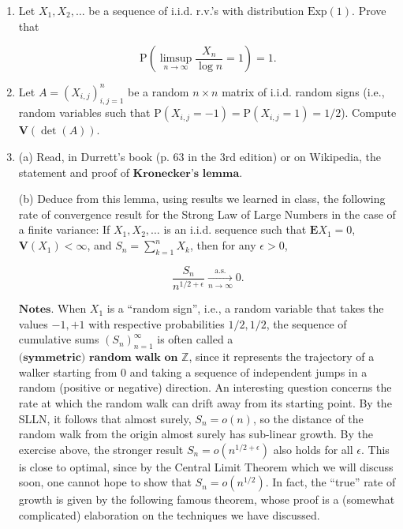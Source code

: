 \documentclass[11pt]{report}
\theoremstyle{plain}
\theoremstyle{definition}
\begin{document}
\begin{enumerate}[label=\arabic*.]
$\textbf{Hint.}$ Assume without loss of generality
that $\mathbf{E} X=0$. For any $a>0$, we have that
$\mathrm{P}(X\ge t) \le \mathrm{P}((X+a)^2\ge
(a+t)^2)$.
Bound this using known methods and then look for the
value of $a$ that gives the best bound.

\item Let $X_1,X_2,\ldots$ be a sequence of i.i.d. r.v.'s
with distribution $\textrm{Exp}(1)$. Prove that

\[
\mathrm{P}\left( \limsup_{n\to\infty} \frac{X_n}{\log n} = 1\right) = 1.
\]

\item Let $A=(X_{i,j})_{i,j=1}^n$ be a random $n\times n$
matrix of i.i.d. random signs (i.e., random variables
such that
$\mathrm{P}(X_{i,j}=-1) = \mathrm{P}(X_{i,j}=1)=1/2$).
Compute $\mathbf{V}(\det(A))$.

\item (a) Read, in Durrett's book (p. 63 in the 3rd
edition) or on Wikipedia, the statement and proof of
$\textbf{Kronecker's lemma}$.

(b) Deduce from this lemma, using results we learned
in class, the following rate of convergence result for
the Strong Law of Large Numbers in the case of a
finite variance: If $X_1, X_2, \ldots$ is an i.i.d.
sequence such that $\mathbf{E} X_1 = 0$,
$\mathbf{V}(X_1)<\infty$, and $S_n=\sum_{k=1}^n X_k$,
then for any $\epsilon>0$,

\[
\frac{S_n}{n^{1/2+\epsilon}} \xrightarrow[n\to\infty]{\textrm{a.s.}} 0.
\]

$\textbf{Notes.}$ When $X_1$ is a ``random sign'',
i.e., a random variable that takes the values $-1,+1$
with respective probabilities $1/2,1/2$, the sequence
of cumulative sums $(S_n)_{n=1}^\infty$ is often
called a
$\textbf{(symmetric) random walk on } \mathbb{Z}$,
since it represents the trajectory of a walker
starting from 0 and taking a sequence of independent
jumps in a random (positive or negative) direction. An
interesting question concerns the rate at which the
random walk can drift away from its starting point. By
the SLLN, it follows that almost surely, $S_n = o(n)$,
so the distance of the random walk from the origin
almost surely has sub-linear growth. By the exercise
above, the stronger result $S_n = o(n^{1/2+\epsilon})$
also holds for all $\epsilon$. This is close to
optimal, since by the Central Limit Theorem which we
will discuss soon, one cannot hope to show that
$S_n = o(n^{1/2})$. In fact, the ``true'' rate of
growth is given by the following famous theorem, whose
proof is a (somewhat complicated) elaboration on the
techniques we have discussed.


\end{enumerate}
\end{document}
